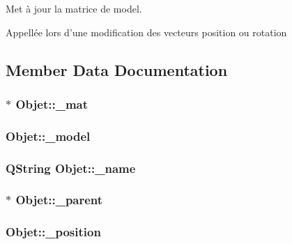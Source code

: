 Met à jour la matrice de model. 

Appellée lors d'une modification des vecteurs position ou rotation 

\subsection{Member Data Documentation}
\hypertarget{class_objet_aefea82be8c63504190ac63d5e44ff61a}{
\subsubsection[{\+\_\+mat}]{$\ast$ Objet\+::\+\_\+mat\hspace{0.3cm}{\ttfamily [protected]}}}\label{class_objet_aefea82be8c63504190ac63d5e44ff61a}
\hypertarget{class_objet_a1963cca59f62c7a6f69a9c2c461ad9ea}{
\subsubsection[{\+\_\+model}]{ Objet\+::\+\_\+model\hspace{0.3cm}{\ttfamily [protected]}}}\label{class_objet_a1963cca59f62c7a6f69a9c2c461ad9ea}
\hypertarget{class_objet_ac19f568a794dd9387386ee71914a868e}{
\subsubsection[{\+\_\+name}]{\setlength{\rightskip}{0pt plus 5cm}Q\+String Objet\+::\+\_\+name\hspace{0.3cm}{\ttfamily [protected]}}}\label{class_objet_ac19f568a794dd9387386ee71914a868e}
\hypertarget{class_objet_a91c5a50011c3fe9233a645aa767a275f}{
\subsubsection[{\+\_\+parent}]{$\ast$ Objet\+::\+\_\+parent\hspace{0.3cm}{\ttfamily [protected]}}}\label{class_objet_a91c5a50011c3fe9233a645aa767a275f}
\hypertarget{class_objet_a6c1a10fa5f4c5cd0e0617d93f42d927b}{
\subsubsection[{\+\_\+position}]{ Objet\+::\+\_\+position\hspace{0.3cm}{\ttfamily [protected]}}}\label{class_objet_a6c1a10fa5f4c5cd0e0617d93f42d927b}
